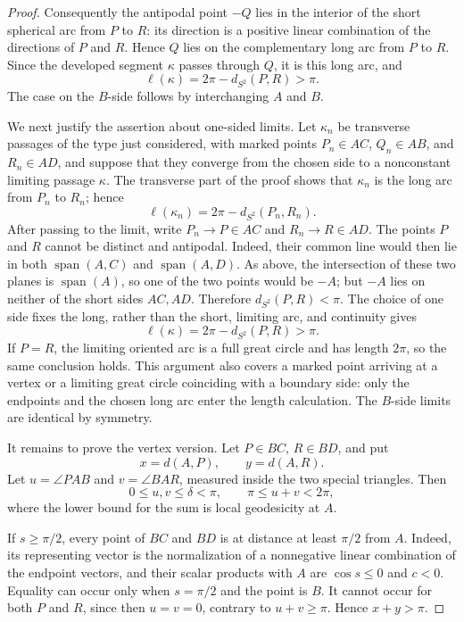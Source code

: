 \documentclass[10pt,a4paper]{amsart}
\begin{document}
\begin{proof}
Consequently the antipodal point \(-Q\) lies in the interior of the short
spherical arc from \(P\) to \(R\): its direction is a positive linear
combination of the directions of \(P\) and \(R\).  Hence \(Q\) lies on the
complementary long arc from \(P\) to \(R\).  Since the developed segment
\(\kappa\) passes through \(Q\), it is this long arc, and
\[
        \ell(\kappa)=2\pi-d_{S^2}(P,R)>\pi.
\]
The case on the \(B\)-side follows by interchanging \(A\) and \(B\).

We next justify the assertion about one-sided limits.  Let
\(\kappa_n\) be transverse passages of the type just considered, with marked
points \(P_n\in AC\), \(Q_n\in AB\), and \(R_n\in AD\), and suppose that they
converge from the chosen side to a nonconstant limiting passage \(\kappa\).
The transverse part of the proof shows that \(\kappa_n\) is the long arc from
\(P_n\) to \(R_n\); hence
\[
        \ell(\kappa_n)=2\pi-d_{S^2}(P_n,R_n).
\]
After passing to the limit, write \(P_n\to P\in AC\) and
\(R_n\to R\in AD\).  The points \(P\) and \(R\) cannot be distinct and
antipodal.  Indeed, their common line would then lie in both
\(\operatorname{span}(A,C)\) and \(\operatorname{span}(A,D)\).  As above, the
intersection of these two planes is \(\operatorname{span}(A)\), so one of the
two points would be \(-A\); but \(-A\) lies on neither of the short sides
\(AC,AD\).  Therefore \(d_{S^2}(P,R)<\pi\).  The choice of one side fixes the
long, rather than the short, limiting arc, and continuity gives
\[
        \ell(\kappa)=2\pi-d_{S^2}(P,R)>\pi.
\]
If \(P=R\), the limiting oriented arc is a full great circle and has length
\(2\pi\), so the same conclusion holds.  This argument also covers a marked
point arriving at a vertex or a limiting great circle coinciding with a
boundary side: only the endpoints and the chosen long arc enter the length
calculation.  The \(B\)-side limits are identical by symmetry.

It remains to prove the vertex version. Let \(P\in BC\), \(R\in BD\), and
put
\[
        x=d(A,P),\qquad y=d(A,R).
\]
Let \(u=\angle PAB\) and \(v=\angle BAR\), measured inside the two special
triangles.  Then
\[
        0\le u,v\le\delta<\pi,
        \qquad
        \pi\le u+v<2\pi,
\]
where the lower bound for the sum is local geodesicity at \(A\).

If \(s\ge\pi/2\), every point of \(BC\) and \(BD\) is at distance at least
\(\pi/2\) from \(A\). Indeed, its representing vector is the normalization
of a nonnegative linear combination of the endpoint vectors, and their scalar
products with \(A\) are \(\cos s\le0\) and \(c<0\). Equality can occur only
when \(s=\pi/2\) and the point is \(B\). It cannot occur for both \(P\) and
\(R\), since then \(u=v=0\), contrary to \(u+v\ge\pi\). Hence
\(x+y>\pi\).


\end{proof}
\end{document}
